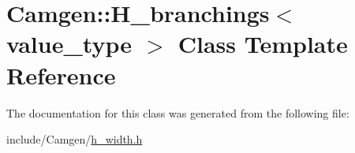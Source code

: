 \hypertarget{a00253}{\section{Camgen\-:\-:H\-\_\-branchings$<$ value\-\_\-type $>$ Class Template Reference}
\label{a00253}
}


The documentation for this class was generated from the following file\-:\begin{DoxyCompactItemize}
\item 
include/\-Camgen/\hyperlink{a00636}{h\-\_\-width.\-h}\end{DoxyCompactItemize}
